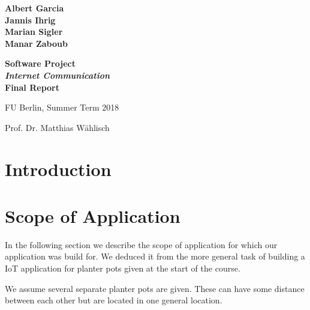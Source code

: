 \documentclass[11pt,paper=a4,parskip=half]{scrartcl}
\begin{document}
\thispagestyle{empty}


\begin{center}

\begin{spacing}{1.2}
\textbf{ \LARGE
Albert Garcia \\
Jannis Ihrig \\
Marian Sigler \\
Manar Zaboub \\
}

\end{spacing}\vspace{1.5em}


\textbf{ \Huge Software Project \\ \emph{Internet Communication} \\\vspace{0.8em}
Final Report}
\vspace{2.5em}

\begin{spacing}{1}
\Large

FU Berlin, Summer Term 2018

Prof. Dr. Matthias Wählisch
\end{spacing}
\end{center}

\vspace{10mm}


\setcounter{tocdepth}{2}
\tableofcontents

\newpage



\section{Introduction}






\section{Scope of Application}
\label{sec:usecase}

  In the following section we describe the scope of application for which our
  application was build for. We deduced it from the more general task of
  building a IoT application for planter pots given at the start of the course.

  We assume several separate planter pots are given. These can have some
  distance between each other but are located in one general location.
\end{document}
